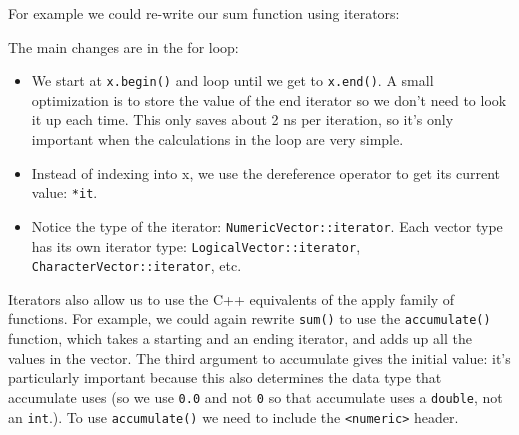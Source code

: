 For example we could re-write our sum function using iterators:

\begin{Shaded}
\begin{Highlighting}[]
 

  \NormalTok{;}
  
\NormalTok{  \}}
\NormalTok{\}}
\end{Highlighting}
\end{Shaded}

The main changes are in the for loop:

\begin{itemize}
\item
  We start at \texttt{x.begin()} and loop until we get to
  \texttt{x.end()}. A small optimization is to store the value of the
  end iterator so we don't need to look it up each time. This only saves
  about 2 ns per iteration, so it's only important when the calculations
  in the loop are very simple.
\item
  Instead of indexing into x, we use the dereference operator to get its
  current value: \texttt{*it}.
\item
  Notice the type of the iterator: \texttt{NumericVector::iterator}.
  Each vector type has its own iterator type:
  \texttt{LogicalVector::iterator}, \texttt{CharacterVector::iterator},
  etc.
\end{itemize}

Iterators also allow us to use the C++ equivalents of the apply family
of functions. For example, we could again rewrite \texttt{sum()} to use
the \texttt{accumulate()} function, which takes a starting and an ending
iterator, and adds up all the values in the vector. The third argument
to accumulate gives the initial value: it's particularly important
because this also determines the data type that accumulate uses (so we
use \texttt{0.0} and not \texttt{0} so that accumulate uses a
\texttt{double}, not an \texttt{int}.). To use \texttt{accumulate()} we
need to include the \texttt{\textless{}numeric\textgreater{}} header.

\begin{Shaded}
\begin{Highlighting}[]
 

   \NormalTok{);}
\NormalTok{\}}
\end{Highlighting}
\end{Shaded}

